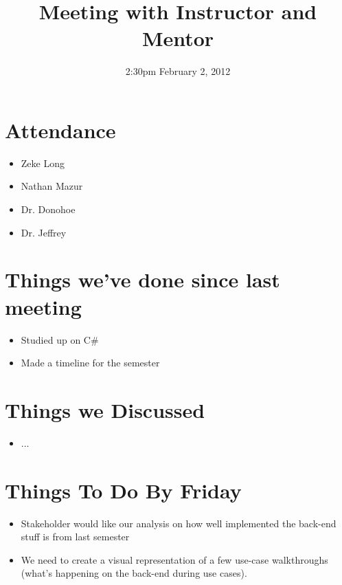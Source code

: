 \documentclass{article}
\begin{document}
\title{Meeting with Instructor and Mentor}
\date{2:30pm February 2, 2012}
\maketitle

\section{Attendance}
\begin{itemize}
\item Zeke Long
\item Nathan Mazur
\item Dr. Donohoe
\item Dr. Jeffrey
\end{itemize}

\section{Things we've done since last meeting}
\begin{itemize}
\item Studied up on C#
\item Made a timeline for the semester
\end{itemize}

\section{Things we Discussed}
\begin{itemize}
\item ...
\end{itemize}

\section{Things To Do By Friday}
\begin{itemize}
\item Stakeholder would like our analysis on how well implemented the back-end stuff is from last semester
\item We need to create a visual representation of a few use-case walkthroughs (what's happening on the back-end during use cases). 
\end{itemize}
\end{document}
